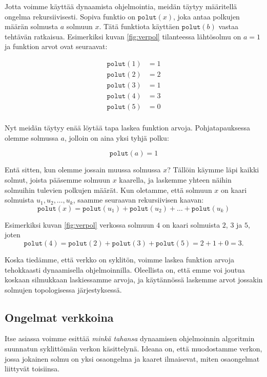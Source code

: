 Jotta voimme käyttää dynaamista ohjelmointia,
meidän täytyy määritellä ongelma rekursiivisesti.
Sopiva funktio on $\texttt{polut}(x)$,
joka antaa polkujen määrän solmusta $a$ solmuun $x$.
Tätä funktiota käyttäen $\texttt{polut}(b)$
vastaa tehtävän ratkaisua.
Esimerkiksi kuvan \ref{fig:verpol} tilanteessa lähtösolmu on $a=1$
ja funktion arvot ovat seuraavat:

\begin{align*}
\texttt{polut}(1)&=1 \\
\texttt{polut}(2)&=2 \\
\texttt{polut}(3)&=1 \\
\texttt{polut}(4)&=3 \\
\texttt{polut}(5)&=0 \\
\end{align*}

Nyt meidän täytyy enää löytää tapa laskea
funktion arvoja.
Pohjatapauksessa olemme solmussa $a$,
jolloin on aina yksi tyhjä polku:

\[ \texttt{polut}(a)=1 \]

Entä sitten, kun olemme jossain muussa solmussa $x$?
Tällöin käymme läpi kaikki solmut, joista pääsemme
solmuun $x$ kaarella, ja laskemme yhteen näihin
solmuihin tulevien polkujen määrät.
Kun oletamme, että solmuun $x$ on kaari solmuista $u_1,u_2,\dots,u_k$,
saamme seuraavan rekursiivisen kaavan:
\[ \texttt{polut}(x)=\texttt{polut}(u_1)+\texttt{polut}(u_2)+\dots+\texttt{polut}(u_k) \]

Esimerkiksi kuvan \ref{fig:verpol} verkossa
solmuun $4$ on kaari solmuista $2$, $3$ ja $5$, joten
\[ \texttt{polut}(4)=\texttt{polut}(2)+\texttt{polut}(3)+\texttt{polut}(5) = 2+1+0 = 3.\]

Koska tiedämme, että verkko on syklitön,
voimme laskea funktion arvoja
tehokkaasti dynaamisella ohjelmoinnilla.
Oleellista on, että emme voi joutua koskaan silmukkaan
laskiessamme arvoja, ja
käytännössä laskemme arvot jossakin solmujen
topologisessa järjestyksessä.

\subsection{Ongelmat verkkoina}

Itse asiassa voimme esittää \emph{minkä tahansa}
dynaamisen ohjelmoinnin algoritmin
suunnatun syklittömän verkon käsittelynä.
Ideana on, että muodostamme verkon, jossa jokainen solmu on
yksi osaongelma ja kaaret ilmaisevat,
miten osaongelmat liittyvät toisiinsa.

